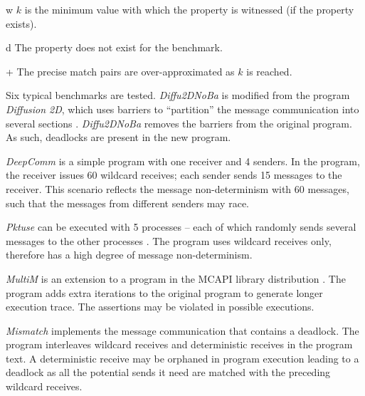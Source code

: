 \begin{savenotes}
\begin{table*}[t]
\begin{center}
\begin{threeparttable}
\begin{tabular}{c|c|c|c|p{0.25cm}|c|c|c|p{0.25cm}|c|c|c|c|c|c|c|}
       
\end{tabular}
\begin{tablenotes}
\item[w] $k$ is the minimum value with which the property is witnessed (if the property exists). 
\item[d] The property does not exist for the benchmark.
\item[+] The precise match pairs are over-approximated as $k$ is reached.
\end{tablenotes}
     \end{threeparttable}
\end{center}
\end{table*}
\end{savenotes}

Six typical benchmarks are tested. \textit{Diffu2DNoBa} is modified from the program \textit{Diffusion 2D}, which uses barriers to “partition” the message communication into several sections \cite{benchmark:fevs}. \textit{Diffu2DNoBa} removes the barriers from the original program. As such, deadlocks are present in the new program.

\textit{DeepComm} is a simple program with one receiver and 4 senders. In the program, the receiver issues 60 wildcard receives; each sender sends 15 messages to the receiver.
This scenario reflects the message non-determinism with 60 messages, such that the messages from different senders may race.

\textit{Pktuse} can be executed with 5 processes -- each of which randomly sends several messages to the other processes \cite{mpptest_benchmark}. The program uses wildcard receives only, therefore has a high degree of message non-determinism.

\textit{MultiM} is an extension to a program in the MCAPI library distribution \cite{DBLP:conf/kbse/HuangMM13}. The program adds extra iterations to the original program to generate longer execution trace. The assertions may be violated in possible executions.

\textit{Mismatch} implements the message communication that contains a deadlock. The program interleaves wildcard receives and deterministic receives in the program text. A deterministic receive may be orphaned in program execution leading to a deadlock as all the potential sends it need are matched with the preceding wildcard receives. 


